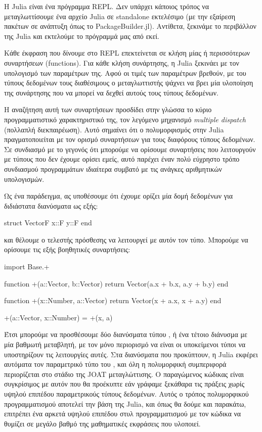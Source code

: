 Η Julia είναι ένα πρόγραμμα REPL.
Δεν υπάρχει κάποιος τρόπος να μεταγλωττίσουμε ένα αρχείο Julia σε standalone εκτελέσιμο (με την εξαίρεση πακέτων σε ανάπτυξη όπως το PackageBuilder.jl).
Αντίθετα, ξεκινάμε το περιβάλλον της Julia και εκτελούμε το πρόγραμμά μας από εκεί.

Κάθε έκφραση που δίνουμε στο REPL επεκτείνεται σε κλήση μίας ή περισσότερων συναρτήσεων (functions).
Για κάθε κλήση συνάρτησης, η Julia ξεκινάει με τον υπολογισμό των παραμέτρων της.
Αφού οι τιμές των παραμέτρων βρεθούν, με του τύπους δεδομένων τους διαθέσιμους ο μεταγλωττιστής ψάχνει να βρει μία υλοποίηση της συνάρτησης που να μπορεί να δεχθεί αυτούς τους τύπους δεδομένων.

Η αναζήτηση αυτή των συναρτήσεων προσδίδει στην γλώσσα το κύριο προγραμματιστικό χαρακτηριστικό της, τον λεγόμενο μηχανισμό \emph{multiple dispatch} (πολλαπλή διεκπαιρέωση).
Αυτό σημαίνει ότι ο πολυμορφισμός στην Julia πραγματοποιείται με τον ορισμό συναρτήσεων για τους διαφόρους τύπους δεδομένων.
Σε συνδιασμό με το γεγονός ότι μπορούμε να ορίσουμε συναρτήσεις που λειτουργούν με τύπους που δεν έχουμε ορίσει εμείς, αυτό παρέχει έναν πολύ εύχρηστο τρόπο συνδιασμού προγραμμάτων ιδιαίτερα συμβατό με τις ανάγκες αριθμητικών υπολογισμών.

Ως ένα παράδειγμα, ας υποθέσουμε ότι έχουμε ορίζει μία δομή δεδομένων για διδιάστατα διανύσματα ως εξής:

{\large
\begin{jllisting}[language=julia,style=jlcodestyle]
struct Vector{F}
    x::F
    y::F
end
\end{jllisting}
}

και θέλουμε ο τελεστής πρόσθεσης \jlinl{+} να λειτουργεί με αυτόν τον τύπο.
Μπορούμε να ορίσουμε τις εξής βοηθητικές συναρτήσεις:

{\large
\begin{jllisting}[language=julia,style=jlcodestyle]
import Base.+

function +(a::Vector, b::Vector)
    return Vector(a.x + b.x, a.y + b.y)
end

function +(x::Number, a::Vector)
    return Vector(x + a.x, x + a.y)
end

+(a::Vector, x::Number) = +(x, a)
\end{jllisting}
}

Έτσι μπορούμε να προσθέσουμε δύο διανύσματα τύπου , ή ένα τέτοιο διάνυσμα με μία βαθμωτή μεταβλητή, με τον μόνο περιορισμό να είναι οι υποκείμενοι τύποι να υποστηρίζουν τις λειτουργίες αυτές.
Στα διανύσματα που προκύπτουν, η Julia εκφέρει αυτόματα τον παραμετρικό τύπο  του , και όλη η πολυμορφική συμπεριφορά περιορίζεται στο στάδιο της JOAT μεταγλώττισης.
Ο παραγώμενος κώδικας είναι συγκρίσιμος με αυτόν που θα προέκυπτε εάν γράφαμε ξεκάθαρα τις πράξεις χωρίς υψηλού επιπέδου παραμετρικούς τύπους δεδομένων.
Αυτός ο τρόπος πολυμορφικού προγραμματισμού αποτελεί την βάση της Julia, και όπως θα δούμε και παρακάτω, επιτρέπει ένα αρκετά υψηλού επιπέδου στυλ προγραμματισμού με τον κώδικα να θυμίζει σε μεγάλο βαθμό της μαθηματικές εκφράσεις που υλοποιεί.

